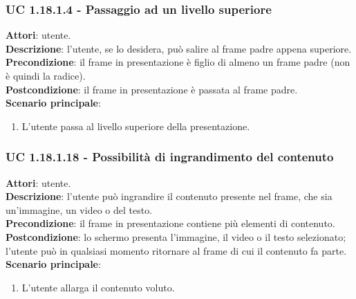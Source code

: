 	\subsubsection{UC 1.18.1.4 - Passaggio ad un livello superiore}{
		\label{uc1.18.1.4}
		\textbf{Attori}: utente. \\
		\textbf{Descrizione}: l'utente, se lo desidera, può salire al frame padre appena superiore. \\
		\textbf{Precondizione}: il frame in presentazione è figlio di almeno un frame padre (non è quindi la radice).	\\
		\textbf{Postcondizione}: il frame in presentazione è passata al frame padre.\\
		\textbf{Scenario principale}:
		\begin{enumerate}
			\item L'utente passa al livello superiore della presentazione.
		\end{enumerate}
	}
	\subsubsection{UC 1.18.1.18 - Possibilità di ingrandimento del contenuto}{
		\label{uc1.18.1.18}
		\textbf{Attori}: utente. \\
		\textbf{Descrizione}: l'utente può ingrandire il contenuto presente nel frame, che sia un'immagine, un video o del testo. \\
		\textbf{Precondizione}: il frame in presentazione contiene più elementi di contenuto.	\\
		\textbf{Postcondizione}: lo schermo presenta l'immagine, il video o il testo selezionato; l'utente può in qualsiasi momento ritornare al frame di cui il contenuto fa parte.\\
		\textbf{Scenario principale}:
		\begin{enumerate}
			\item L'utente allarga il contenuto voluto.
		\end{enumerate}
	}
